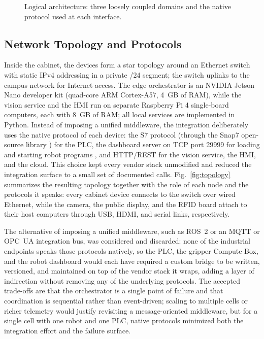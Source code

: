 ﻿\documentclass[conference]{IEEEtran}
\begin{document}
\begin{figure}[!t]
\caption{Logical architecture: three loosely coupled domains and the native protocol used at each interface.}
\label{fig:architecture}
\end{figure}

\subsection{Network Topology and Protocols}
Inside the cabinet, the devices form a star topology around an Ethernet switch with static IPv4 addressing in a private /24 segment; the switch uplinks to the campus network for Internet access. The edge orchestrator is an NVIDIA Jetson Nano developer kit (quad-core ARM Cortex-A57, 4~GB of RAM), while the vision service and the HMI run on separate Raspberry Pi 4 single-board computers, each with 8~GB of RAM; all local services are implemented in Python.
Instead of imposing a unified middleware, the integration deliberately uses the native protocol of each device: the S7 protocol (through the Snap7 open-source library \cite{b13}) for the PLC, the dashboard server on TCP port 29999 for loading and starting robot programs \cite{b14}, and HTTP/REST for the vision service, the HMI, and the cloud. This choice kept every vendor stack unmodified and reduced the integration surface to a small set of documented calls. Fig.~\ref{fig:topology} summarizes the resulting topology together with the role of each node and the protocols it speaks: every cabinet device connects to the switch over wired Ethernet, while the camera, the public display, and the RFID board attach to their host computers through USB, HDMI, and serial links, respectively.

The alternative of imposing a unified middleware, such as ROS~2 \cite{b16} or an MQTT or OPC~UA integration bus, was considered and discarded: none of the industrial endpoints speaks those protocols natively, so the PLC, the gripper Compute Box, and the robot dashboard would each have required a custom bridge to be written, versioned, and maintained on top of the vendor stack it wraps, adding a layer of indirection without removing any of the underlying protocols. The accepted trade-offs are that the orchestrator is a single point of failure and that coordination is sequential rather than event-driven; scaling to multiple cells or richer telemetry would justify revisiting a message-oriented middleware, but for a single cell with one robot and one PLC, native protocols minimized both the integration effort and the failure surface.
\end{document}
